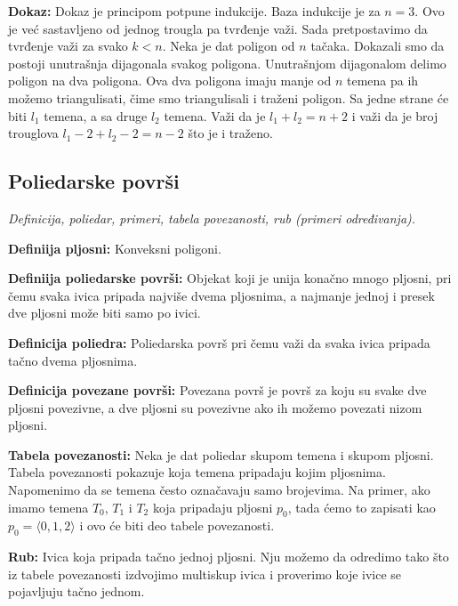 \documentclass[12pt]{article}
\begin{document}
\textbf{Dokaz:} Dokaz je principom potpune indukcije. Baza indukcije je za
$n=3$. Ovo je već sastavljeno od jednog trougla pa tvrđenje važi. Sada
pretpostavimo da tvrđenje važi za svako $k<n$. Neka je dat poligon od $n$
tačaka. Dokazali smo da postoji unutrašnja dijagonala svakog poligona.
Unutrašnjom dijagonalom delimo poligon na dva poligona. Ova dva poligona imaju
manje od $n$ temena pa ih možemo triangulisati, čime smo triangulisali i
traženi poligon. Sa jedne strane će biti $l_1$ temena, a sa druge $l_2$ temena.
Važi da je $l_1+l_2=n+2$ i važi da je broj trouglova $l_1-2+l_2-2=n-2$ što je
i traženo.

\subsection{Poliedarske površi}
\textit{Definicija, poliedar, primeri, tabela povezanosti, rub (primeri
    određivanja).}
\par
\vspace*{1cm}

\textbf{Definiija pljosni:} Konveksni poligoni.
\par

\textbf{Definiija poliedarske površi:} Objekat koji je unija konačno mnogo
pljosni, pri čemu svaka ivica pripada najviše dvema pljosnima, a najmanje
jednoj i presek dve pljosni može biti samo po ivici.
\par

\textbf{Definicija poliedra:} Poliedarska površ pri čemu važi da svaka ivica
pripada tačno dvema pljosnima.
\par

\textbf{Definicija povezane površi:} Povezana površ je površ za koju su svake
dve pljosni povezivne, a dve pljosni su povezivne ako ih možemo povezati nizom
pljosni.
\par

\textbf{Tabela povezanosti:} Neka je dat poliedar skupom temena i skupom
pljosni. Tabela povezanosti pokazuje koja temena pripadaju kojim pljosnima.
Napomenimo da se temena često označavaju samo brojevima. Na primer, ako imamo
temena $T_0$, $T_1$ i $T_2$ koja pripadaju pljosni $p_0$, tada ćemo to zapisati
kao $p_0=\langle0,1,2\rangle$ i ovo će biti deo tabele povezanosti.
\par

\textbf{Rub:} Ivica koja pripada tačno jednoj pljosni. Nju možemo da odredimo
tako što iz tabele povezanosti izdvojimo multiskup ivica i proverimo koje ivice
se pojavljuju tačno jednom.
\end{document}
